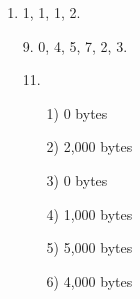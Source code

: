 \documentclass[11pt]{article}
\begin{document}
\begin{enumerate}
    \item   1, 1, 1, 2.

    \item[9.]   0, 4, 5, 7, 2, 3.

    \item[11.]  
        \begin{enumerate}
            \item[1)]   0 bytes
            \item[2)]   2,000 bytes
            \item[3)]   0 bytes
            \item[4)]   1,000 bytes
            \item[5)]   5,000 bytes
            \item[6)]   4,000 bytes
        \end{enumerate}
\end{enumerate}
\end{document}
